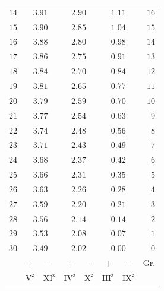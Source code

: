 \begin{center}
\begin{tabular}{r||cc|cc|cc||r}
$14$&\multicolumn{2}{c|}{$3.91$}&\multicolumn{2}{c|}{$2.90$}&\multicolumn{2}{c||}{$1.11$}&$16$\\
$15$&\multicolumn{2}{c|}{$3.90$}&\multicolumn{2}{c|}{$2.85$}&\multicolumn{2}{c||}{$1.04$}&$15$\\[3pt]
$16$&\multicolumn{2}{c|}{$3.88$}&\multicolumn{2}{c|}{$2.80$}&\multicolumn{2}{c||}{$0.98$}&$14$\\
$17$&\multicolumn{2}{c|}{$3.86$}&\multicolumn{2}{c|}{$2.75$}&\multicolumn{2}{c||}{$0.91$}&$13$\\
$18$&\multicolumn{2}{c|}{$3.84$}&\multicolumn{2}{c|}{$2.70$}&\multicolumn{2}{c||}{$0.84$}&$12$\\
$19$&\multicolumn{2}{c|}{$3.81$}&\multicolumn{2}{c|}{$2.65$}&\multicolumn{2}{c||}{$0.77$}&$11$\\
$20$&\multicolumn{2}{c|}{$3.79$}&\multicolumn{2}{c|}{$2.59$}&\multicolumn{2}{c||}{$0.70$}&$10$\\[3pt]
$21$&\multicolumn{2}{c|}{$3.77$}&\multicolumn{2}{c|}{$2.54$}&\multicolumn{2}{c||}{$0.63$}&$9$\\
$22$&\multicolumn{2}{c|}{$3.74$}&\multicolumn{2}{c|}{$2.48$}&\multicolumn{2}{c||}{$0.56$}&$8$\\
$23$&\multicolumn{2}{c|}{$3.71$}&\multicolumn{2}{c|}{$2.43$}&\multicolumn{2}{c||}{$0.49$}&$7$\\
$24$&\multicolumn{2}{c|}{$3.68$}&\multicolumn{2}{c|}{$2.37$}&\multicolumn{2}{c||}{$0.42$}&$6$\\
$25$&\multicolumn{2}{c|}{$3.66$}&\multicolumn{2}{c|}{$2.31$}&\multicolumn{2}{c||}{$0.35$}&$5$\\[3pt]
$26$&\multicolumn{2}{c|}{$3.63$}&\multicolumn{2}{c|}{$2.26$}&\multicolumn{2}{c||}{$0.28$}&$4$\\
$27$&\multicolumn{2}{c|}{$3.59$}&\multicolumn{2}{c|}{$2.20$}&\multicolumn{2}{c||}{$0.21$}&$3$\\
$28$&\multicolumn{2}{c|}{$3.56$}&\multicolumn{2}{c|}{$2.14$}&\multicolumn{2}{c||}{$0.14$}&$2$\\
$29$&\multicolumn{2}{c|}{$3.53$}&\multicolumn{2}{c|}{$2.08$}&\multicolumn{2}{c||}{$0.07$}&$1$\\
$30$&\multicolumn{2}{c|}{$3.49$}&\multicolumn{2}{c|}{$2.02$}&\multicolumn{2}{c||}{$0.00$}&$0$\\
\hline
&$+$&$-$&$+$&$-$&$+$&$-$&Gr.\\
&$\mathrm V^{\mathrm z}$&$\mathrm{XI}^{\mathrm z}$&$\mathrm{IV}^{\mathrm z}$&$\mathrm X^{\mathrm z}$&$\mathrm{III}^{\mathrm z}$&$\mathrm{IX}^{\mathrm z}$&
\end{tabular}
\endgroup
\end{center}
